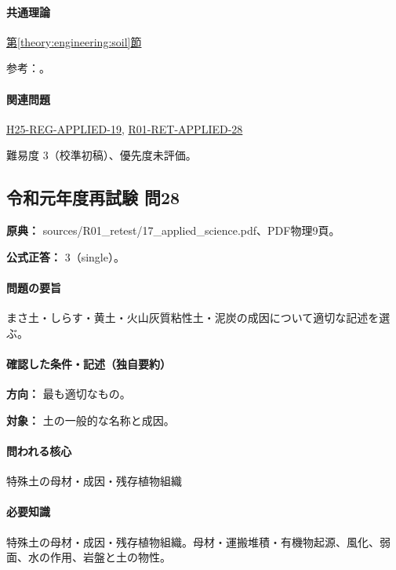 \paragraph{共通理論} \hyperref[theory:engineering:soil]{第\ref*{theory:engineering:soil}節}

\par 参考：\cite{mlit_masa,maff_shiras2017,mlit_peat,gsj_loess2002}。

\paragraph{関連問題} \hyperref[q:h25-reg-applied-19]{H25-REG-APPLIED-19}, \hyperref[q:r01-ret-applied-28]{R01-RET-APPLIED-28}

\par 難易度 3（校準初稿）、優先度未評価。

\subsection{令和元年度再試験 問28}
\label{q:r01-ret-applied-28}

\noindent\textbf{原典：} sources/R01\_retest/17\_applied\_science.pdf、PDF物理9頁。

\textbf{公式正答：} 3（single）。

\paragraph{問題の要旨} まさ土・しらす・黄土・火山灰質粘性土・泥炭の成因について適切な記述を選ぶ。

\paragraph{確認した条件・記述（独自要約）}\mbox{}\par

\noindent\textbf{方向：} 最も適切なもの。\par

\noindent\textbf{対象：} 土の一般的な名称と成因。\par

\paragraph{問われる核心} 特殊土の母材・成因・残存植物組織

\paragraph{必要知識} 特殊土の母材・成因・残存植物組織。母材・運搬堆積・有機物起源、風化、弱面、水の作用、岩盤と土の物性。

